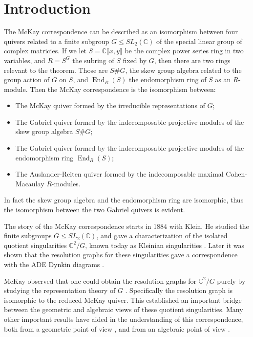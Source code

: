 \documentclass[11pt, a4paper, english]{article}
\theoremstyle{definition}
\newcommand{\C}{\mathbb{C}}
\DeclareMathOperator{\End}{End}
\begin{document}
\section*{Introduction}
The McKay correspondence can be described as an isomorphism between four quivers related to a finite subgroup $G \leq SL_2(\C)$ of the special linear group of complex matricies. If we let $S = \C\llbracket x, y \rrbracket$ be the complex power series ring in two variables, and $R = S^G$ the subring of $S$ fixed by $G$, then there are two rings relevant to the theorem. Those are $S\#G$, the skew group algebra related to the group action of $G$ on $S$, and $\End_R(S)$ the endomorphism ring of $S$ as an $R$-module. Then the McKay correspondence is the isomorphism between:
\begin{itemize}
\item The McKay quiver formed by the irreducible representations of $G$;
\item The Gabriel quiver formed by the indecomposable projective modules of the skew group algebra $S\#G$;
\item The Gabriel quiver formed by the indecomposable projective modules of the endomorphism ring $\End_R(S)$;
\item The Auslander-Reiten quiver formed by the indecomposable maximal Cohen-Macaulay $R$-modules.
\end{itemize}
In fact the skew group algebra and the endomorphism ring are isomorphic, thus the isomorphism between the two Gabriel quivers is evident.

The story of the McKay correspondence starts in 1884 with Klein. He studied the finite subgroups $G \leq SL_2(\C)$, and gave a characterization of the isolated quotient singularities $\C^2/G$, known today as Kleinian singularities \cite{Kle84}. Later it was shown that the resolution graphs for these singularities gave a correspondence with the ADE Dynkin diagrams \cite{DuV34, Art66}.

McKay observed that one could obtain the resolution graphs for $\C^2/G$ purely by studying the representation theory of $G$ \cite{Mck83}. Specifically the resolution graph is isomorphic to the reduced McKay quiver. This established an important bridge between the geometric and algebraic views of these quotient singularities. Many other important results have aided in the understanding of this correspondence, both from a geometric point of view \cite{GSV81, AV85, EK85}, and from an algebraic point of view \cite{Aus86, AR89}.
\end{document}
